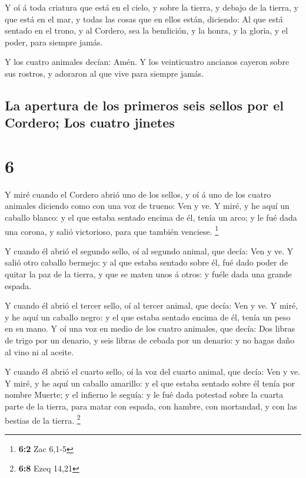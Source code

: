  Y oí á toda criatura que está en el cielo, y sobre la
tierra, y debajo de la tierra, y que está en el mar, y todas las cosas
que en ellos están, diciendo: Al que está sentado en el trono, y al
Cordero, sea la bendición, y la honra, y la gloria, y el poder, para
siempre jamás.

 Y los cuatro animales decían: Amén. Y los veinticuatro
ancianos cayeron sobre sus rostros, y adoraron al que vive para siempre
jamás.

\hypertarget{la-apertura-de-los-primeros-seis-sellos-por-el-cordero-los-cuatro-jinetes}{%
\subsection{La apertura de los primeros seis sellos por el Cordero; Los
cuatro
jinetes}\label{la-apertura-de-los-primeros-seis-sellos-por-el-cordero-los-cuatro-jinetes}}

\hypertarget{section-5}{%
\section{6}\label{section-5}}

 Y miré cuando el Cordero abrió uno de los sellos, y oí á
uno de los cuatro animales diciendo como con una voz de trueno: Ven y
ve.  Y miré, y he aquí un caballo blanco: y el que estaba
sentado encima de él, tenía un arco; y le fué dada una corona, y salió
victorioso, para que también venciese. \footnote{\textbf{6:2} Zac 6,1-5}

 Y cuando él abrió el segundo sello, oí al segundo animal,
que decía: Ven y ve.  Y salió otro caballo bermejo: y al que
estaba sentado sobre él, fué dado poder de quitar la paz de la tierra, y
que se maten unos á otros: y fuéle dada una grande espada.

 Y cuando él abrió el tercer sello, oí al tercer animal, que
decía: Ven y ve. Y miré, y he aquí un caballo negro: y el que estaba
sentado encima de él, tenía un peso en su mano.  Y oí una
voz en medio de los cuatro animales, que decía: Dos libras de trigo por
un denario, y seis libras de cebada por un denario: y no hagas daño al
vino ni al aceite.

 Y cuando él abrió el cuarto sello, oí la voz del cuarto
animal, que decía: Ven y ve.  Y miré, y he aquí un caballo
amarillo: y el que estaba sentado sobre él tenía por nombre Muerte; y el
infierno le seguía: y le fué dada potestad sobre la cuarta parte de la
tierra, para matar con espada, con hambre, con mortandad, y con las
bestias de la tierra. \footnote{\textbf{6:8} Ezeq 14,21}

